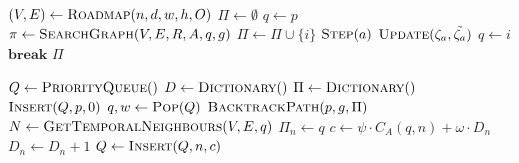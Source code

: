 \begin{algorithm}[ht]
    \caption{$\Function{GetPath}(n, d, w, h, \delta, p, g, O, A, R)$}
    \\\algorithmicensure{}
    \label{algo:path}
    \begin{algorithmic}[1]
        \setcounter{ALC@line}{0}
        \STATE $(V, E) \leftarrow \Function{Roadmap}(n, d, w, h, O)$
        \STATE $\Pi \leftarrow \emptyset$
        \STATE $q \leftarrow p$
            \STATE $\pi \leftarrow \Function{SearchGraph}(V, E, R, A, q, g)$
                \STATE $\Pi \leftarrow \Pi \cup \{i\}$
                    \STATE $\Function{Step}(a)$
                \ENDFOR
                        \STATE $\Function{Update}(\zeta_a, \tilde{\zeta_a})$
                    \ENDFOR
                    \STATE $q \leftarrow i$
                    \STATE $\textbf{break}$
                \ENDIF
            \ENDFOR
        \ENDWHILE
        \RETURN $\Pi$
    \end{algorithmic}
\end{algorithm}

\begin{algorithm}[ht]
    \caption{$\Function{SearchGraph}(V, E, R, A, p, g)$}
    \label{algo:search}
    \begin{algorithmic}[1]
        \setcounter{ALC@line}{0}
        \vspace*{1mm}
        \STATE $Q \leftarrow \Function{PriorityQueue}()$
        \STATE $D \leftarrow \Function{Dictionary}()$
        \STATE $\Pi \leftarrow \Function{Dictionary}()$
        \STATE $\Function{Insert}(Q, p, 0)$
            \STATE $q, w \leftarrow \Function{Pop}(Q)$
                \RETURN $\Function{BacktrackPath}(p, g, \Pi)$
            \ENDIF
            \STATE $N \leftarrow \Function{GetTemporalNeighbours}(V, E, q)$
                \STATE $\Pi_n \leftarrow q$
                \STATE $c \leftarrow \psi \cdot C_A(q, n) + \omega \cdot D_n$
                \STATE $D_n \leftarrow D_n + 1$
                \STATE $Q \leftarrow \Function{Insert}(Q, n, c)$
            \ENDFOR
        \ENDWHILE
    \end{algorithmic}
\end{algorithm}

